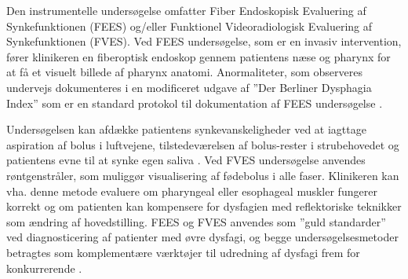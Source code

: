\documentclass[main.tex]{subfiles}
\begin{document}
Den instrumentelle undersøgelse omfatter Fiber Endoskopisk Evaluering af Synkefunktionen (FEES) og/eller Funktionel Videoradiologisk Evaluering af Synkefunktionen (FVES).  Ved FEES undersøgelse, som er en invasiv intervention, fører klinikeren en fiberoptisk endoskop gennem patientens næse og pharynx for at få et visuelt billede af pharynx anatomi. Anormaliteter, som observeres undervejs dokumenteres i en modificeret udgave af ”Der Berliner Dysphagia Index” som er en standard protokol til dokumentation af FEES undersøgelse \cite{afLambertsenKMDKock-JensenCMDKjrsgaardAMScOTHansenTSMsci/MPHWestergaardLMD2007ModificeretIndex}. 

Undersøgelsen kan afdække patientens synkevanskeligheder ved at iagttage aspiration af bolus i luftvejene, tilstedeværelsen af bolus-rester i strubehovedet og patientens evne til at synke egen saliva \cite[s. 27-28]{Kjaersgaard2013DifficultiesPerspective}. 
Ved FVES undersøgelse anvendes røntgenstråler, som muliggør visualisering af fødebolus i alle faser. Klinikeren kan vha. denne metode evaluere om pharyngeal eller esophageal muskler fungerer korrekt og om patienten kan kompensere for dysfagien med reflektoriske teknikker som ændring af hovedstilling. FEES og FVES anvendes som ”guld standarder” ved diagnosticering af patienter med øvre dysfagi, og begge undersøgelsesmetoder betragtes som komplementære værktøjer til udredning af dysfagi frem for konkurrerende \cite[s. 50]{Kjaersgaard2013DifficultiesPerspective}.




\end{document}
